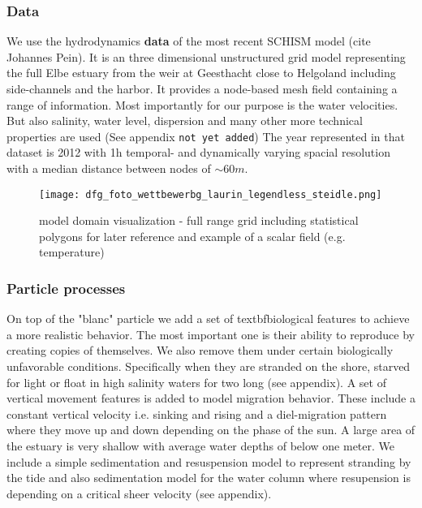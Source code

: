 \subsubsection*{Data}
We use the hydrodynamics \textbf{data} of the most recent SCHISM model (cite Johannes Pein).
It is an three dimensional unstructured  grid model representing the full Elbe estuary from the weir at Geesthacht close to Helgoland including side-channels and the harbor.
It provides a node-based mesh field containing a range of information.
Most importantly for our purpose is the water velocities.
But also salinity, water level, dispersion and many other more technical properties are used (See appendix \texttt{not yet added})
The year represented in that dataset is 2012 with 1h temporal- and dynamically varying spacial resolution with a median distance between nodes of $\sim60m$.

\begin{figure}
    \texttt{[image: dfg\_foto\_wettbewerbg\_laurin\_legendless\_steidle.png]}
    \caption{model domain visualization - full range grid including statistical polygons for later reference and example of a scalar field (e.g. temperature)}
    \label{fig:statistial polygons}
\end{figure}

\subsubsection*{Particle processes}

On top of the "blanc" particle we add a set of textbf{biological features} to achieve a more realistic behavior.
The most important one is their ability to reproduce by creating copies of themselves.
We also remove them under certain biologically unfavorable conditions. Specifically when they are stranded on the shore, starved for light or float in high salinity waters for two long (see appendix).
A set of vertical movement features is added to model migration behavior. 
These include a constant vertical velocity i.e. sinking and rising and a diel-migration pattern where they move up and down depending on the phase of the sun.
A large area of the estuary is very shallow with average water depths of below one meter. 
We include a simple sedimentation and resuspension model to represent stranding by the tide and also sedimentation model for the water column where resupension is depending on a critical sheer velocity (see appendix).

